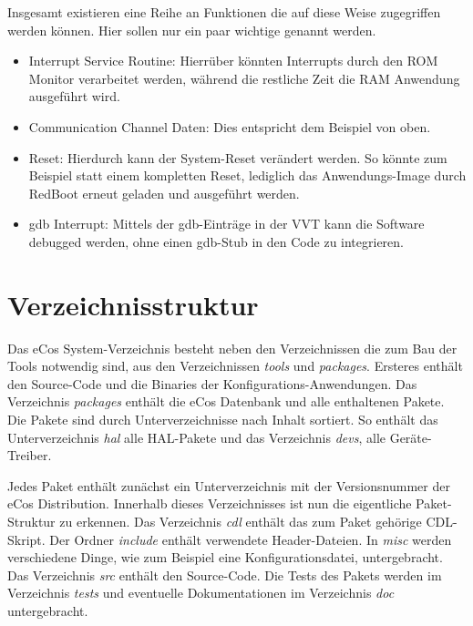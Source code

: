 \documentclass[
  a4paper,					%
  twoside,
  DIV=calc,     				%
  bibliography=totoc,
  cleardoublepage=empty,
  ngerman,     					%
  final       					%
]{scrbook}
\begin{document}
Insgesamt existieren eine Reihe an Funktionen die auf diese Weise zugegriffen werden können. Hier sollen nur ein paar wichtige genannt werden.

\begin{itemize}
	\item Interrupt Service Routine: Hierrüber könnten Interrupts durch den ROM Monitor verarbeitet werden, während die restliche Zeit die RAM Anwendung ausgeführt wird.
	\item Communication Channel Daten: Dies entspricht dem Beispiel von oben.
	\item Reset: Hierdurch kann der System-Reset verändert werden. So könnte zum Beispiel statt einem kompletten Reset, lediglich das Anwendungs-Image durch RedBoot erneut geladen und ausgeführt werden.
	\item gdb Interrupt: Mittels der gdb-Einträge in der VVT kann die Software debugged werden, ohne einen gdb-Stub in den Code zu integrieren.
\end{itemize}








\section{Verzeichnisstruktur}
\label{sec:dir}
Das eCos System-Verzeichnis besteht neben den Verzeichnissen die zum Bau der Tools notwendig sind, aus den Verzeichnissen \emph{tools} und \emph{packages}. Ersteres enthält den Source-Code und die Binaries der Konfigurations-Anwendungen. Das Verzeichnis \emph{packages} enthält die eCos Datenbank und alle enthaltenen Pakete. Die Pakete sind durch Unterverzeichnisse nach Inhalt sortiert. So enthält das Unterverzeichnis \emph{hal} alle HAL-Pakete und das Verzeichnis \emph{devs}, alle Geräte-Treiber.

Jedes Paket enthält zunächst ein Unterverzeichnis mit der Versionsnummer der eCos Distribution. Innerhalb dieses Verzeichnisses ist nun die eigentliche Paket-Struktur zu erkennen. Das Verzeichnis \emph{cdl} enthält das zum Paket gehörige CDL-Skript. Der Ordner \emph{include} enthält verwendete Header-Dateien. In \emph{misc} werden verschiedene Dinge, wie zum Beispiel eine Konfigurationsdatei, untergebracht. Das Verzeichnis \emph{src} enthält den Source-Code. Die Tests des Pakets werden im Verzeichnis \emph{tests} und eventuelle Dokumentationen im Verzeichnis \emph{doc} untergebracht.
\end{document}
